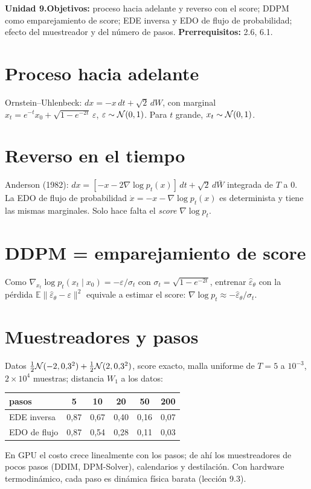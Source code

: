 \documentclass[11pt,a4paper]{article}
\begin{document}

\noindent\textbf{Unidad 9.}\quad\textbf{Objetivos:} proceso hacia adelante y reverso con el score; DDPM como emparejamiento de score; EDE inversa y EDO de flujo
de probabilidad; efecto del muestreador y del número de pasos.
\textbf{Prerrequisitos:} 2.6, 6.1.

\section{Proceso hacia adelante}
Ornstein--Uhlenbeck: $dx=-x\,dt+\sqrt2\,dW$, con marginal $x_t=e^{-t}x_0+\sqrt{1-e^{-2t}}\,\varepsilon$, $\varepsilon\sim\mathcal{N}(0,1)$. Para $t$ grande, $x_t\sim\mathcal{N}(0,1)$.

\section{Reverso en el tiempo}
Anderson (1982): $dx=[-x-2\nabla\log p_t(x)]\,dt+\sqrt2\,d\bar W$ integrada de $T$ a $0$. La EDO de flujo de probabilidad $\dot x=-x-\nabla\log p_t(x)$ es
determinista y tiene las mismas marginales. Solo hace falta el \emph{score} $\nabla\log p_t$.

\section{DDPM = emparejamiento de score}
Como $\nabla_{x_t}\log p_t(x_t\mid x_0)=-\varepsilon/\sigma_t$ con $\sigma_t=\sqrt{1-e^{-2t}}$, entrenar $\hat\varepsilon_\theta$ con la pérdida $\mathbb E\|\hat\varepsilon_\theta-\varepsilon\|^2$
equivale a estimar el score: $\nabla\log p_t\approx-\hat\varepsilon_\theta/\sigma_t$.

\section{Muestreadores y pasos \evS}
Datos $\frac12\mathcal{N}(-2,0{,}3^2)+\frac12\mathcal{N}(2,0{,}3^2)$, score exacto, malla uniforme de $T=5$ a $10^{-3}$, $2\times10^4$ muestras; distancia $W_1$ a los datos:
\begin{center}\begin{tabular}{lccccc}\toprule
pasos & 5 & 10 & 20 & 50 & 200\\\midrule
EDE inversa & 0,87 & 0,67 & 0,40 & 0,16 & 0,07\\
EDO de flujo & 0,87 & 0,54 & 0,28 & 0,11 & 0,03\\\bottomrule\end{tabular}\end{center}
En GPU el costo crece linealmente con los pasos; de ahí los muestreadores de pocos pasos (DDIM, DPM-Solver), calendarios y destilación. Con hardware termodinámico, cada paso es
dinámica física barata (lección 9.3).
\end{document}
